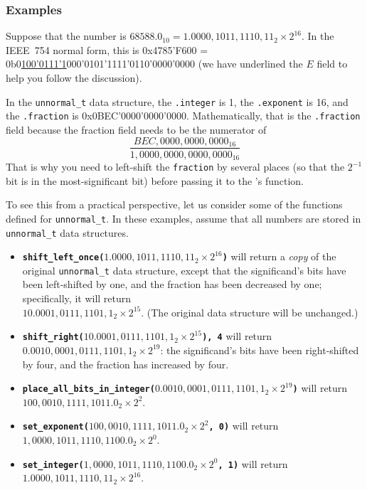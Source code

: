 \subsubsection*{Examples}

Suppose that the number is $68588.0_{10} = 1.0000,1011,1110,11_{2} \times 2^{16}$.
In the IEEE~754 normal form, this is 0x4785'F600 = 0b0\underline{100'0111'1}000'0101'1111'0110'0000'0000 (we have underlined the $E$ field to help you follow the discussion).

In the \lstinline{unnormal_t} data structure, the \lstinline{.integer} is 1, the \lstinline{.exponent} is 16, and the \lstinline{.fraction} is 0x0BEC'0000'0000'0000.
Mathematically, that is the \lstinline{.fraction} field because the fraction field needs to be the numerator of
\[\frac{BEC,0000,0000,0000_{16}}{1,0000,0000,0000,0000_{16}}\]
That is why you need to left-shift the \lstinline{fraction} by several places (so that the $2^{-1}$ bit is in the most-significant bit) before passing it to the 's function.

To see this from a practical perspective, let us consider some of the functions defined for \lstinline{unnormal_t}.
In these examples, assume that all numbers are stored in \lstinline{unnormal_t} data structures.
\begin{itemize}
    \item \textbf{\texttt{shift\_left\_once($1.0000,1011,1110,11_{2} \times 2^{16}$)}} will return a \textit{copy} of the original \lstinline{unnormal_t} data structure, except that the significand's bits have been left-shifted by one, and the fraction has been decreased by one;
        specifically, it will return \\ $10.0001,0111,1101,1_{2} \times 2^{15}$.
        (The original data structure will be unchanged.)
    \item \textbf{\texttt{shift\_right($10.0001,0111,1101,1_{2} \times 2^{15}$), 4}} will return \\
        $0.0010,0001,0111,1101,1_{2} \times 2^{19}$: the significand's bits have been right-shifted by four, and the fraction has increased by four.
    \item \textbf{\texttt{place\_all\_bits\_in\_integer($0.0010,0001,0111,1101,1_{2} \times 2^{19}$)}} will return \\
        $100,0010,1111,1011.0_{2} \times 2^{2}$.
    \item \textbf{\texttt{set\_exponent($100,0010,1111,1011.0_{2} \times 2^{2}$, 0)}} will return  \\
        $1,0000,1011,1110,1100.0_{2} \times 2^{0}$.
    \item \textbf{\texttt{set\_integer($1,0000,1011,1110,1100.0_{2} \times 2^{0}$, 1)}} will return  \\
        $1.0000,1011,1110,11_{2} \times 2^{16}$.
\end{itemize}


